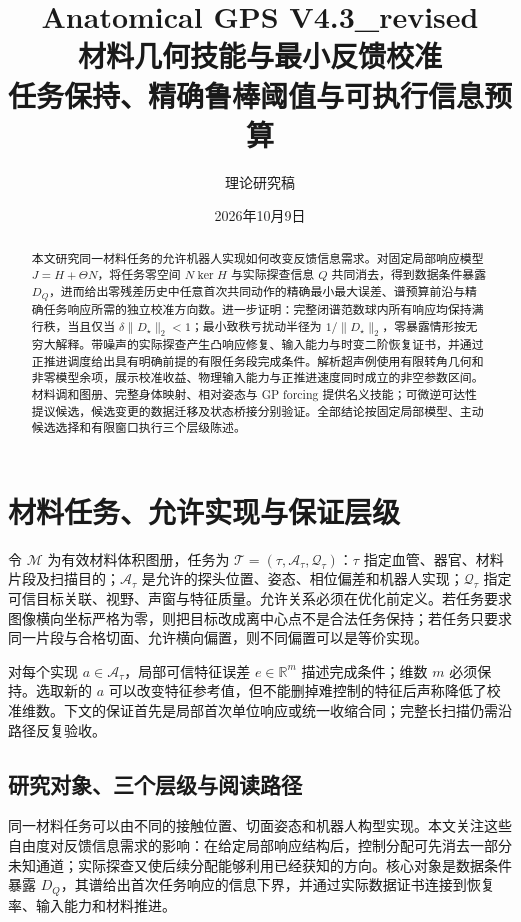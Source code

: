 \documentclass[11pt,a4paper]{article}
\numberwithin{equation}{section}
\theoremstyle{definition}
\newcommand{\R}{\mathbb R}
\begin{document}
\title{Anatomical GPS V4.3\_revised\\[3mm]
\Large 材料几何技能与最小反馈校准\\[2mm]
\large 任务保持、精确鲁棒阈值与可执行信息预算}
\author{理论研究稿}
\date{2026年10月9日}
\maketitle
\begin{abstract}
本文研究同一材料任务的允许机器人实现如何改变反馈信息需求。对固定局部响应模型 $J=H+\Theta N$，将任务零空间 $N\ker H$ 与实际探查信息 $Q$ 共同消去，得到数据条件暴露 $D_Q$，进而给出零残差历史中任意首次共同动作的精确最小最大误差、谱预算前沿与精确任务响应所需的独立校准方向数。进一步证明：完整闭谱范数球内所有响应均保持满行秩，当且仅当 $\delta\|D_\star\|_2<1$；最小致秩亏扰动半径为 $1/\|D_\star\|_2$，零暴露情形按无穷大解释。带噪声的实际探查产生凸响应修复、输入能力与时变二阶恢复证书，并通过正推进调度给出具有明确前提的有限任务段完成条件。解析超声例使用有限转角几何和非零模型余项，展示校准收益、物理输入能力与正推进速度同时成立的非空参数区间。材料调和图册、完整身体映射、相对姿态与 GP forcing 提供名义技能；可微逆可达性提议候选，候选变更的数据迁移及状态桥接分别验证。全部结论按固定局部模型、主动候选选择和有限窗口执行三个层级陈述。
\end{abstract}
\newpage
\begingroup\footnotesize\setlength{\parskip}{0pt}\tableofcontents\endgroup
\newpage
\section{材料任务、允许实现与保证层级}\label{sec:rev:task}
令 $\mathcal M$ 为有效材料体积图册，任务为 $\mathcal T=(\tau,\mathcal A_\tau,\mathcal Q_\tau)$：$\tau$ 指定血管、器官、材料片段及扫描目的；$\mathcal A_\tau$ 是允许的探头位置、姿态、相位偏差和机器人实现；$\mathcal Q_\tau$ 指定可信目标关联、视野、声窗与特征质量。允许关系必须在优化前定义。若任务要求图像横向坐标严格为零，则把目标改成离中心点不是合法任务保持；若任务只要求同一片段与合格切面、允许横向偏置，则不同偏置可以是等价实现。

对每个实现 $a\in\mathcal A_\tau$，局部可信特征误差 $e\in\R^m$ 描述完成条件；维数 $m$ 必须保持。选取新的 $a$ 可以改变特征参考值，但不能删掉难控制的特征后声称降低了校准维数。下文的保证首先是局部首次单位响应或统一收缩合同；完整长扫描仍需沿路径反复验收。

\subsection{研究对象、三个层级与阅读路径}
同一材料任务可以由不同的接触位置、切面姿态和机器人构型实现。本文关注这些自由度对反馈信息需求的影响：在给定局部响应结构后，控制分配可先消去一部分未知通道；实际探查又使后续分配能够利用已经获知的方向。核心对象是数据条件暴露 $D_Q$，其谱给出首次任务响应的信息下界，并通过实际数据证书连接到恢复率、输入能力和材料推进。
\end{document}
